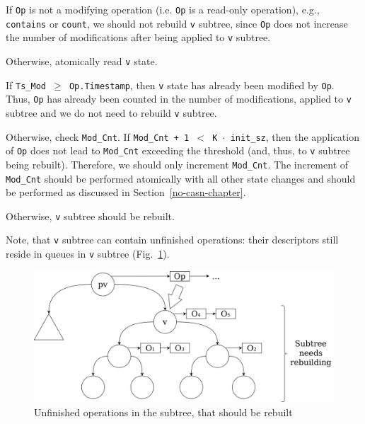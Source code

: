 \documentclass[times, dvipsnames,%
               languages={russian,english} %
              ]{itmo-student-thesis}
\begin{document}
\begin{nenum}
    \item If \texttt{Op} is not a modifying operation (i.e. \texttt{Op} is a read-only operation), e.g., \texttt{contains} or \texttt{count}, we should not rebuild \texttt{v} subtree, since \texttt{Op} does not increase the number of modifications after being applied to \texttt{v} subtree.
    
    \item Otherwise, atomically read \texttt{v} state.
    
    \item If \texttt{Ts\_Mod $\geq$ Op.Timestamp}, then \texttt{v} state has already been modified by \texttt{Op}. Thus, \texttt{Op} has already been counted in the number of modifications, applied to \texttt{v} subtree and we do not need to rebuild \texttt{v} subtree.
    
    \item Otherwise, check \texttt{Mod\_Cnt}. If \texttt{Mod\_Cnt + 1 $<$ K $\cdot$ init\_sz}, then the application of \texttt{Op} does not lead to \texttt{Mod\_Cnt} exceeding the threshold (and, thus, to \texttt{v} subtree being rebuilt). Therefore, we should only increment \texttt{Mod\_Cnt}. The increment of \texttt{Mod\_Cnt} should be performed atomically with all other state changes and should be performed as discussed in Section~\ref{no-casn-chapter}.
     
    \item Otherwise, \texttt{v} subtree should be rebuilt.
\end{nenum}

\bigbreak

Note, that \texttt{v} subtree can contain unfinished operations: their descriptors still reside in queues in \texttt{v} subtree (Fig.~\ref{rebuild-unfinished-pic}).

\begin{figure}[H]
  \centering
  \caption{Unfinished operations in the subtree, that should be rebuilt}
  \label{rebuild-unfinished-pic}
  \includegraphics[width=\linewidth]{pics/rebuild-unfinished.png}
\end{figure}
\end{document}
